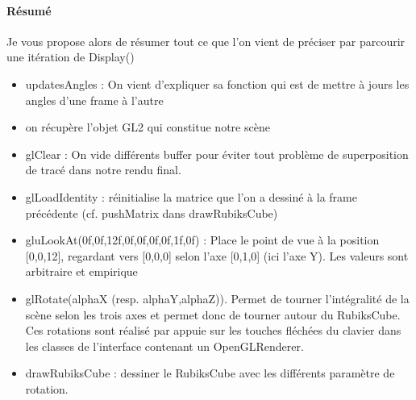 \paragraph{Résumé}
Je vous propose alors de résumer tout ce que l’on vient de préciser par parcourir une itération de Display()
\begin{itemize}
   \item  updatesAngles : On vient d’expliquer sa fonction qui est de mettre à jours les angles d’une frame à l’autre

    \item on récupère l’objet GL2 qui constitue notre scène

    \item glClear : On vide différents buffer pour éviter tout problème de superposition de tracé dans notre rendu final.

    \item glLoadIdentity : réinitialise la matrice que l’on a dessiné à la frame précédente (cf. pushMatrix dans drawRubiksCube)

    \item gluLookAt(0f,0f,12f,0f,0f,0f,0f,1f,0f) : Place le point de vue à la position [0,0,12], regardant vers [0,0,0] selon l’axe [0,1,0] (ici l’axe Y). Les valeurs sont arbitraire et empirique

    \item glRotate(alphaX (resp. alphaY,alphaZ)). Permet de tourner l’intégralité de la scène selon les trois axes et permet donc de tourner autour du RubiksCube. Ces rotations sont réalisé par appuie sur les touches fléchées du clavier dans les classes de l’interface contenant un OpenGLRenderer.

    \item drawRubiksCube : dessiner le RubiksCube avec les différents paramètre de rotation.
\end{itemize}
















